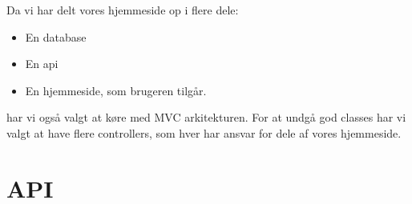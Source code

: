 \documentclass[a4paper]{article}
\begin{document}
Da vi har delt vores hjemmeside op i flere dele:
\begin{itemize}
    \item En database
    \item En api
    \item En hjemmeside, som brugeren tilgår.
\end{itemize}

har vi også valgt at køre med MVC arkitekturen.
For at undgå god classes har vi valgt at have flere controllers, som hver har ansvar for dele af vores hjemmeside.

\section{API}
\end{document}
